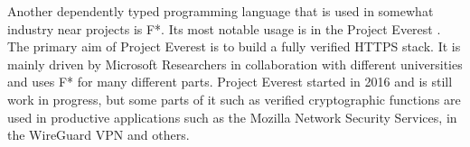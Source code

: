 Another dependently typed programming language that is used in somewhat industry near projects is F*. 
Its most notable usage is in the Project Everest \cite{project_everest_github_io}. The primary aim of Project Everest is to build a fully verified HTTPS stack.
It is mainly driven by Microsoft Researchers in collaboration with different universities and uses F* for many different parts.
Project Everest started in 2016 and is still work in progress, but some parts of it such as verified cryptographic functions are used in productive applications such as the Mozilla Network Security Services\cite{project_everest_slides},  in the WireGuard VPN and others.
